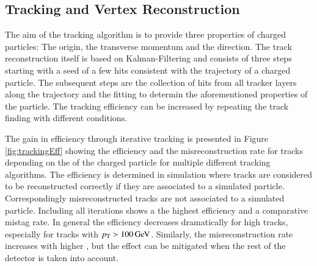 \subsection{Tracking and Vertex Reconstruction}

The aim of the tracking algorithm is to provide three properties of charged particles: The origin, the transverse momentum and the direction.
The track reconstruction itself is based on Kalman-Filtering \cite{Adam:934067} and consists of three steps starting with a seed of a few hits consistent with the trajectory of a charged particle.
The subsequent steps are the collection of hits from all tracker layers along the trajectory and the fitting to determin the aforementioned properties of the particle.
The tracking efficiency can be increased by repeating the track finding with different conditions.

The gain in efficiency through iterative tracking is presented in Figure \ref{fig:trackingEff} showing the efficiency and the misreconstruction rate for tracks depending on the \pt of the charged particle for 
multiple different tracking algorithms. The efficiency is determined in simulation where tracks are considered to be reconstructed correctly if they are associated to a simulated particle. Correspondingly 
misreconstructed tracks are not associated to a simulated particle. 
Including all iterations shows a the highest efficiency and a comparative mistag rate. In general the efficiency decreases dramatically for high \pt tracks, especially for tracks with $p_{\mathrm{T}} > 100 \,\text{Ge\hspace{-.08em}V}$.
Similarly, the misreconstruction rate increases with higher \pt, but the effect can be mitigated when the rest of the detector is taken into account.

